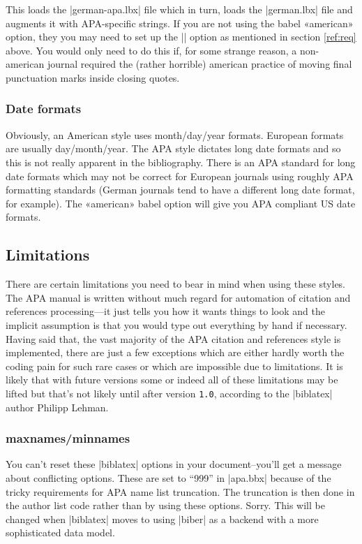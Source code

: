 \documentclass{ltxdockit}
\begin{document}
This loads the |german-apa.lbx| file which in turn, loads the |german.lbx|
file and augments it with APA-specific strings. If you are not using the
babel «american» option, they you may need to set up the
|\DeclareQuotePunctuation| option as mentioned in section \ref{ref:req} above.
You would only need to do this if, for some strange reason, a non-american
journal required the (rather horrible) american practice of moving final
punctuation marks inside closing quotes.

\subsubsection{Date formats}

Obviously, an American style uses month/day/year formats. European formats
are usually day/month/year. The APA style dictates long date formats and so
this is not really apparent in the bibliography. There is an APA standard
for long date formats which may not be correct for European journals using
roughly APA formatting standards (German journals tend to have a different
long date format, for example). The «american» babel option will give you
APA compliant US date formats.

\subsection{Limitations}
\label{use:limit}
There are certain limitations you need to bear in mind when using these
styles. The APA manual is written without much regard for automation of
citation and references processing---it just tells you how it wants things to
look and the implicit assumption is that you would type out everything by
hand if necessary. Having said that, the vast majority of the APA citation
and references style is implemented, there are just a few exceptions which
are either hardly worth the coding pain for such rare cases or which are
impossible due to  limitations. It is likely that with future
 versions some or indeed all of these limitations may be
lifted but that's not likely until after  version
\texttt{1.0}, according to the |biblatex| author Philipp Lehman.

\subsubsection{maxnames/minnames}

You can't reset these |biblatex| options in your document--you'll get a
message about conflicting options. These are set to ``999'' in |apa.bbx|
because of the tricky requirements for APA name list truncation. The
truncation is then done in the author list code rather than by using these
options. Sorry. This will be changed when |biblatex| moves to using |biber|
as a backend with a more sophisticated data model.
\end{document}
